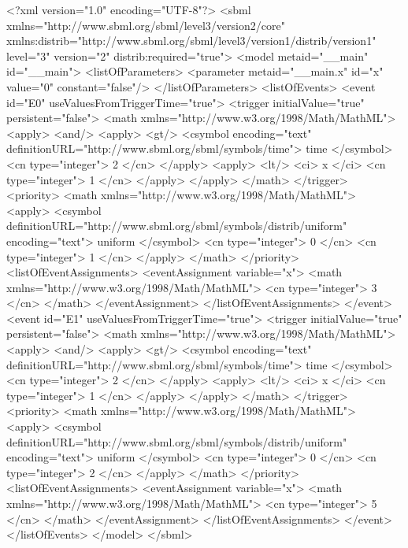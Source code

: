 \documentclass[draftspec]{sbmlpkgspec}
\begin{document}
\begin{example}
<?xml version="1.0" encoding="UTF-8"?>
<sbml xmlns="http://www.sbml.org/sbml/level3/version2/core"
      xmlns:distrib="http://www.sbml.org/sbml/level3/version1/distrib/version1"
      level="3" version="2" distrib:required="true">
  <model metaid="__main" id="__main">
    <listOfParameters>
      <parameter metaid="__main.x" id="x" value="0" constant="false"/>
    </listOfParameters>
    <listOfEvents>
      <event id="E0" useValuesFromTriggerTime="true">
        <trigger initialValue="true" persistent="false">
          <math xmlns="http://www.w3.org/1998/Math/MathML">
            <apply>
              <and/>
              <apply>
                <gt/>
                <csymbol encoding="text" definitionURL="http://www.sbml.org/sbml/symbols/time">
                         time </csymbol>
                <cn type="integer"> 2 </cn>
              </apply>
              <apply>
                <lt/>
                <ci> x </ci>
                <cn type="integer"> 1 </cn>
              </apply>
            </apply>
          </math>
        </trigger>
        <priority>
          <math xmlns="http://www.w3.org/1998/Math/MathML">
            <apply>
              <csymbol definitionURL="http://www.sbml.org/sbml/symbols/distrib/uniform"
                       encoding="text"> uniform  </csymbol>
              <cn type="integer"> 0 </cn>
              <cn type="integer"> 1 </cn>
            </apply>
          </math>
        </priority>
        <listOfEventAssignments>
          <eventAssignment variable="x">
            <math xmlns="http://www.w3.org/1998/Math/MathML">
              <cn type="integer"> 3 </cn>
            </math>
          </eventAssignment>
        </listOfEventAssignments>
      </event>
      <event id="E1" useValuesFromTriggerTime="true">
        <trigger initialValue="true" persistent="false">
          <math xmlns="http://www.w3.org/1998/Math/MathML">
            <apply>
              <and/>
              <apply>
                <gt/>
                <csymbol encoding="text" definitionURL="http://www.sbml.org/sbml/symbols/time">
                         time </csymbol>
                <cn type="integer"> 2 </cn>
              </apply>
              <apply>
                <lt/>
                <ci> x </ci>
                <cn type="integer"> 1 </cn>
              </apply>
            </apply>
          </math>
        </trigger>
        <priority>
          <math xmlns="http://www.w3.org/1998/Math/MathML">
            <apply>
              <csymbol definitionURL="http://www.sbml.org/sbml/symbols/distrib/uniform"
                       encoding="text"> uniform  </csymbol>
              <cn type="integer"> 0 </cn>
              <cn type="integer"> 2 </cn>
            </apply>
          </math>
        </priority>
        <listOfEventAssignments>
          <eventAssignment variable="x">
            <math xmlns="http://www.w3.org/1998/Math/MathML">
              <cn type="integer"> 5 </cn>
            </math>
          </eventAssignment>
        </listOfEventAssignments>
      </event>
    </listOfEvents>
  </model>
</sbml>
\end{example}
\end{document}
